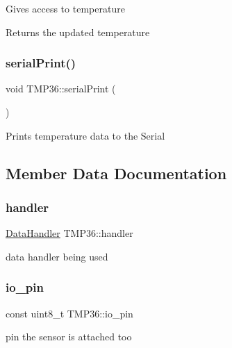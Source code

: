 Gives access to temperature \begin{DoxyReturn}{Returns}
the updated temperature 
\end{DoxyReturn}
\mbox{\label{class_t_m_p36_a7e09f2c40c8cbcb80ab6333480277611}} 
\subsubsection{\texorpdfstring{serial\+Print()}{serialPrint()}}
{\footnotesize\ttfamily void T\+M\+P36\+::serial\+Print (\begin{DoxyParamCaption}{ }\end{DoxyParamCaption})}

Prints temperature data to the Serial 

\subsection{Member Data Documentation}
\mbox{\label{class_t_m_p36_a452d439e40c40c24b41b49ae573e7b1e}} 
\subsubsection{\texorpdfstring{handler}{handler}}
{\footnotesize\ttfamily \hyperlink{class_data_handler}{Data\+Handler} T\+M\+P36\+::handler\hspace{0.3cm}{\ttfamily [private]}}

data handler being used \mbox{\label{class_t_m_p36_abbe6b02af520ddf052d7a23930174365}} 
\subsubsection{\texorpdfstring{io\+\_\+pin}{io\_pin}}
{\footnotesize\ttfamily const uint8\+\_\+t T\+M\+P36\+::io\+\_\+pin\hspace{0.3cm}{\ttfamily [private]}}

pin the sensor is attached too \mbox{\label{class_t_m_p36_a515e4a254610bcc0581200f4c37f8309}} 

